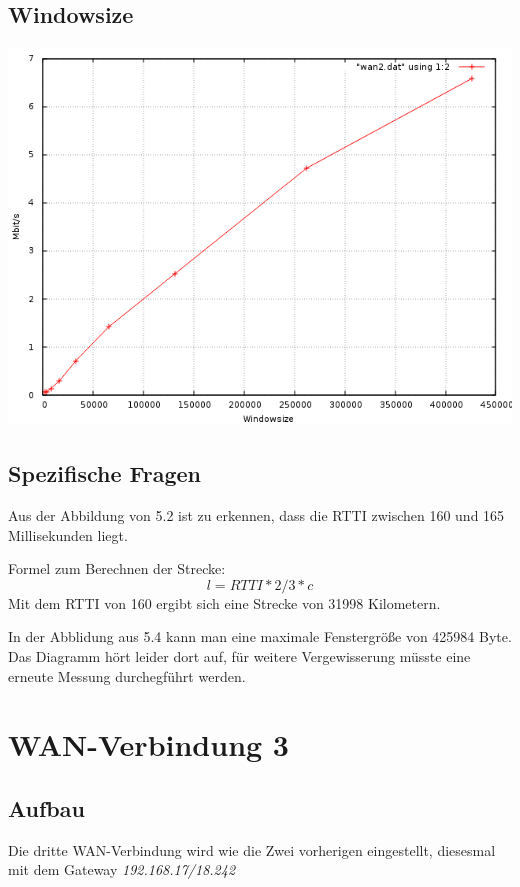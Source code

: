 \documentclass[a4paper,10pt]{article}
\begin{document}
\subsection{Windowsize}
\includegraphics[scale=0.75]{wan2_windows.png}

\subsection{Spezifische Fragen}
\begin{itemize}
 \item Aus der Abbildung von 5.2 ist zu erkennen, dass die RTTI zwischen 160 und 165 Millisekunden liegt.
 \item {Formel zum Berechnen der Strecke: 
 \begin{equation}
  l=RTTI*2/3*c
 \end{equation}
 Mit dem RTTI von 160 ergibt sich eine Strecke von 31998 Kilometern.
 \item In der Abblidung aus 5.4 kann man eine maximale Fenstergröße von 425984 Byte. Das Diagramm hört leider dort auf, 
 für weitere Vergewisserung müsste eine erneute Messung durchegführt werden.}
\end{itemize}


\section{WAN-Verbindung 3}

\subsection{Aufbau}
Die dritte WAN-Verbindung wird wie die Zwei vorherigen eingestellt, diesesmal mit dem Gateway \textit{192.168.17/18.242}
\end{document}

